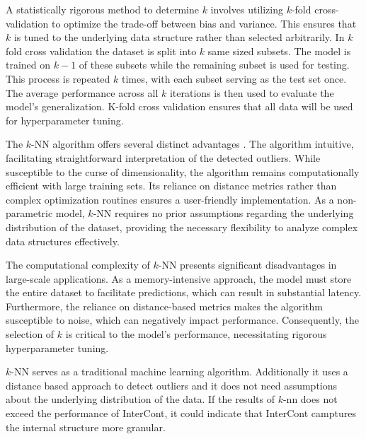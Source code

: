 A statistically rigorous method to determine $k$ involves utilizing $k$-fold cross-validation \citep[p. 1586]{wong2019reliable} to optimize the trade-off between bias and variance. 
This ensures that $k$ is tuned to the underlying data structure rather than selected arbitrarily.
In $k$ fold cross validation the dataset is split into $k$ same sized subsets.
The model is trained on $k-1$ of these subsets while the remaining subset is used for testing.
This process is repeated $k$ times, with each subset serving as the test set once.
The average performance across all $k$ iterations is then used to evaluate the model's generalization.
K-fold cross validation ensures that all data will be used for hyperparameter tuning.


The $k$-NN algorithm offers several distinct advantages \citep[p. 1258]{taunk2019brief}. 
The algorithm intuitive, facilitating straightforward interpretation of the detected outliers.
While susceptible to the curse of dimensionality, the algorithm remains computationally efficient with large training sets.
Its reliance on distance metrics rather than complex optimization routines ensures a user-friendly implementation. 
As a non-parametric model, $k$-NN requires no prior assumptions regarding the underlying distribution of the dataset, providing the necessary flexibility to analyze complex data structures effectively.


The computational complexity of $k$-NN presents significant disadvantages in large-scale applications. 
As a memory-intensive approach, the model must store the entire dataset to facilitate predictions, which can result in substantial latency.
Furthermore, the reliance on distance-based metrics makes the algorithm susceptible to noise, which can negatively impact performance. 
Consequently, the selection of $k$ is critical to the model's performance, necessitating rigorous hyperparameter tuning.


$k$-NN serves as a traditional machine learning algorithm. 
Additionally it uses a distance based approach to detect outliers and it does not need assumptions about the underlying distribution of the data.  
If the results of $k$-nn does not exceed the performance of InterCont, it could indicate that InterCont camptures the internal structure more granular.





